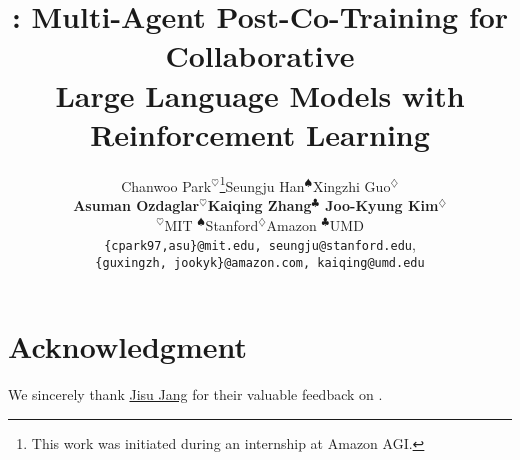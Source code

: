 \documentclass[11pt]{article}
\title{\ours \textcolor{MapleRed}{\faIcon{canadian-maple-leaf}}: Multi-Agent Post-Co-Training for Collaborative \\Large Language Models with Reinforcement Learning}
\author{Chanwoo Park$^\heartsuit$\thanks{This work was initiated during an internship at Amazon AGI.}\hspace{0.9cm}Seungju Han$^\spadesuit$\hspace{0.9cm}Xingzhi Guo$^\diamondsuit$\\
\textbf{\hspace{0cm}Asuman Ozdaglar$^\heartsuit$\hspace{0.59cm}Kaiqing Zhang$^\clubsuit$\hspace{0.48cm}
Joo-Kyung Kim$^\diamondsuit$} \\[0.1cm]
$^\heartsuit$MIT \hspace{0.8cm}$^\spadesuit$Stanford\hspace{0.8cm}$^\diamondsuit$Amazon \hspace{0.8cm}$^\clubsuit$UMD\\
\texttt{{\{cpark97,asu\}@mit.edu}, seungju@stanford.edu}, \\
\texttt{\{guxingzh, jookyk\}@amazon.com, kaiqing@umd.edu}
}
\begin{document}
\maketitle









\section*{Acknowledgment} We sincerely thank \href{https://scholar.google.com/citations?hl=en&user=K5WXLYEAAAAJ&view_op=list_works&authuser=2&sortby=pubdate}{Jisu Jang} for their valuable feedback on .


\onecolumn
\appendix





\end{document}
